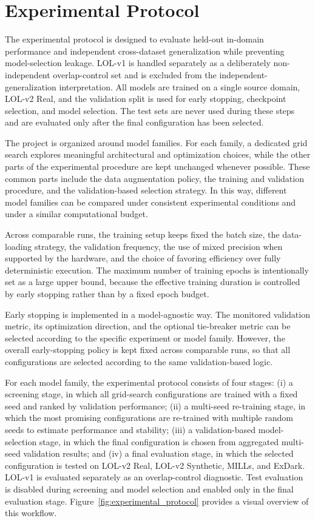 \section{Experimental Protocol}
\label{sec:experimental_protocol}

The experimental protocol is designed to evaluate held-out in-domain performance and independent cross-dataset generalization while preventing model-selection leakage. LOL-v1 is handled separately as a deliberately non-independent overlap-control set and is excluded from the independent-generalization interpretation. All models are trained on a single source domain, LOL-v2 Real, and the validation split is used for early stopping, checkpoint selection, and model selection. The test sets are never used during these steps and are evaluated only after the final configuration has been selected.

The project is organized around model families. For each family, a dedicated grid search explores meaningful architectural and optimization choices, while the other parts of the experimental procedure are kept unchanged whenever possible. These common parts include the data augmentation policy, the training and validation procedure, and the validation-based selection strategy. In this way, different model families can be compared under consistent experimental conditions and under a similar computational budget.

Across comparable runs, the training setup keeps fixed the batch size, the data-loading strategy, the validation frequency, the use of mixed precision when supported by the hardware, and the choice of favoring efficiency over fully deterministic execution. The maximum number of training epochs is intentionally set as a large upper bound, because the effective training duration is controlled by early stopping rather than by a fixed epoch budget.

Early stopping is implemented in a model-agnostic way. The monitored validation metric, its optimization direction, and the optional tie-breaker metric can be selected according to the specific experiment or model family. However, the overall early-stopping policy is kept fixed across comparable runs, so that all configurations are selected according to the same validation-based logic.

For each model family, the experimental protocol consists of four stages: (i) a screening stage, in which all grid-search configurations are trained with a fixed seed and ranked by validation performance; (ii) a multi-seed re-training stage, in which the most promising configurations are re-trained with multiple random seeds to estimate performance and stability; (iii) a validation-based model-selection stage, in which the final configuration is chosen from aggregated multi-seed validation results; and (iv) a final evaluation stage, in which the selected configuration is tested on LOL-v2 Real, LOL-v2 Synthetic, MILLs, and ExDark. LOL-v1 is evaluated separately as an overlap-control diagnostic. Test evaluation is disabled during screening and model selection and enabled only in the final evaluation stage. Figure~\ref{fig:experimental_protocol} provides a visual overview of this workflow.

